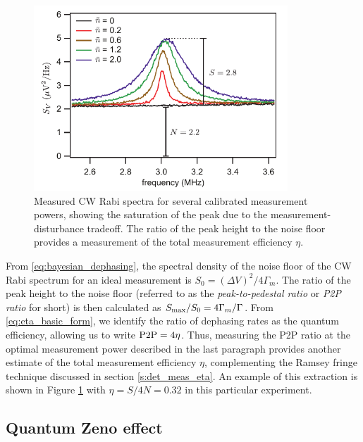 \begin{figure}
\begin{center}
	\includegraphics[width = 3.75in]{qfb_results_chapter/P2P}
\end{center}
\caption[Peak-to-pedestal ratio]{Measured CW Rabi spectra for several calibrated measurement powers, showing the saturation of the peak due to the measurement-disturbance tradeoff.  The ratio of the peak height to the noise floor provides a measurement of the total measurement efficiency $\eta$.}
\label{fig:P2P}
\end{figure}

From \eqref{eq:bayesian_dephasing}, the spectral density of the noise floor of the CW Rabi spectrum for an ideal measurement is $S_0 = (\Delta V)^2 / 4 \Gamma_m$.  The ratio of the peak height to the noise floor (referred to as the \textit{peak-to-pedestal ratio} or \textit{P2P ratio} for short) is then calculated as $S_{\rm max} / S_0 = 4 \Gamma_m / \Gamma$.   From \eqref{eq:eta_basic_form}, we identify the ratio of dephasing rates as the quantum efficiency, allowing us to write $\rm P2P = 4 \eta$.  Thus, measuring the P2P ratio at the optimal measurement power described in the last paragraph provides another estimate of the total measurement efficiency $\eta$, complementing the Ramsey fringe technique discussed in section \ref{s:det_meas_eta}.  An example of this extraction is shown in Figure \ref{fig:P2P} with $\eta = S/4N = 0.32$ in this particular experiment.

\subsection{Quantum Zeno effect}

